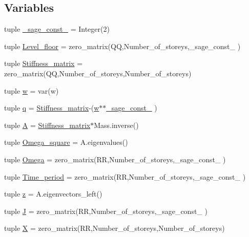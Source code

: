 \subsection*{Variables}
\begin{DoxyCompactItemize}
\item 
tuple \hyperlink{namespacemain_ad85d7913c0e40b9e1f30e64611a0fafa}{\+\_\+sage\+\_\+const\+\_} = Integer(2)
\item 
tuple \hyperlink{namespacemain_ad7b051da0e829aff37fef1e171e37fa3}{Level\+\_\+floor} = zero\+\_\+matrix(Q\+Q,Number\+\_\+of\+\_\+storeys,\+\_\+sage\+\_\+const\+\_ )
\item 
tuple \hyperlink{namespacemain_a0011be18dbc87087d6aaf28802f121c0}{Stiffness\+\_\+matrix} = zero\+\_\+matrix(Q\+Q,Number\+\_\+of\+\_\+storeys,Number\+\_\+of\+\_\+storeys)
\item 
tuple \hyperlink{namespacemain_af76005101c339a32cd5d37ba82ee072c}{w} = var(\textquotesingle{}w\textquotesingle{})
\item 
tuple \hyperlink{namespacemain_a1787a37505189f764069a45071189112}{q} = \hyperlink{namespacemain_a0011be18dbc87087d6aaf28802f121c0}{Stiffness\+\_\+matrix}-\/(\hyperlink{namespacemain_af76005101c339a32cd5d37ba82ee072c}{w}$\ast$$\ast$\hyperlink{namespacemain_ad85d7913c0e40b9e1f30e64611a0fafa}{\+\_\+sage\+\_\+const\+\_} )
\item 
tuple \hyperlink{namespacemain_ad101f166a53497f04b37636bcadbfe65}{A} = \hyperlink{namespacemain_a0011be18dbc87087d6aaf28802f121c0}{Stiffness\+\_\+matrix}$\ast$Mass.\+inverse()
\item 
tuple \hyperlink{namespacemain_a63066086ca439ff34de16475b00387f5}{Omega\+\_\+square} = A.\+eigenvalues()
\item 
tuple \hyperlink{namespacemain_af44dcb60e61649c65257466d65b4d548}{Omega} = zero\+\_\+matrix(R\+R,Number\+\_\+of\+\_\+storeys,\+\_\+sage\+\_\+const\+\_ )
\item 
tuple \hyperlink{namespacemain_a6bf4b8266bcb3b4f390149620fea3d6c}{Time\+\_\+period} = zero\+\_\+matrix(R\+R,Number\+\_\+of\+\_\+storeys,\+\_\+sage\+\_\+const\+\_ )
\item 
tuple \hyperlink{namespacemain_a2d5b336e3b2f7d2e14f04fa3cc413457}{z} = A.\+eigenvectors\+\_\+left()
\item 
tuple \hyperlink{namespacemain_a00488f5887e168f7781b6fb94dd08518}{J} = zero\+\_\+matrix(R\+R,Number\+\_\+of\+\_\+storeys,\+\_\+sage\+\_\+const\+\_ )
\item 
tuple \hyperlink{namespacemain_a5eac8e4368036ef94463d6e42c1628c5}{X} = zero\+\_\+matrix(R\+R,Number\+\_\+of\+\_\+storeys,Number\+\_\+of\+\_\+storeys)
$$
\end{DoxyCompactItemize}

